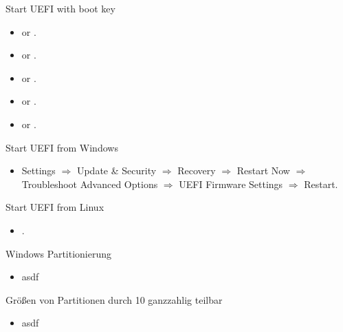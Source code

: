 \begin{frame}[fragile]{Start UEFI with boot key}
  \begin{itemize}
    \item {}  or .
    \item {}  or .
    \item {}  or .
    \item {}  or .
    \item {}  or .
  \end{itemize}
\end{frame}

\begin{frame}{Start UEFI from Windows}
  \begin{itemize}
    \item Settings $\Rightarrow$ Update \& Security $\Rightarrow$ Recovery $\Rightarrow$ Restart Now $\Rightarrow$ Troubleshoot Advanced Options $\Rightarrow$ UEFI Firmware Settings $\Rightarrow$ Restart.
  \end{itemize}
\end{frame}
%
\begin{frame}[fragile]{Start UEFI from Linux}
  \begin{itemize}
    \item {}.
  \end{itemize}
\end{frame}

\begin{frame}[fragile]{Windows Partitionierung}
  \begin{itemize}
    \item asdf
  \end{itemize}
\end{frame}

\begin{frame}[fragile]{Größen von Partitionen durch 10 ganzzahlig teilbar}
  \begin{itemize}
    \item asdf
  \end{itemize}
\end{frame}

